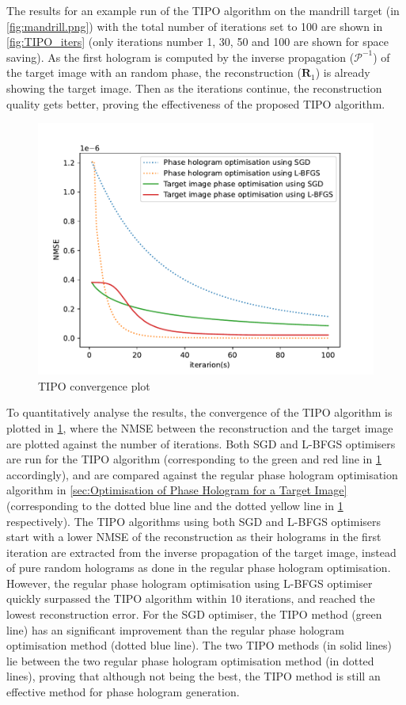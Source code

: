 The results for an example run of the TIPO algorithm on the mandrill target (in \cref{fig:mandrill.png}) with the total number of iterations set to 100 are shown in \cref{fig:TIPO_iters} (only iterations number 1, 30, 50 and 100 are shown for space saving). As the first hologram is computed by the inverse propagation ($\mathcal{P}^{-1}$) of the target image with an random phase, the reconstruction ($\textbf{R}_1$) is already showing the target image. Then as the iterations continue, the reconstruction quality gets better, proving the effectiveness of the proposed TIPO algorithm.

\begin{figure}[H]
	\centering
	\includegraphics[width=\textwidth]{TIPO_convergence.pdf}
	\caption{TIPO convergence plot}
	\label{fig:TIPO_convergence}
\end{figure}

To quantitatively analyse the results, the convergence of the TIPO algorithm is plotted in \cref{fig:TIPO_convergence}, where the NMSE between the reconstruction and the target image are plotted against the number of iterations. Both SGD and L-BFGS optimisers are run for the TIPO algorithm (corresponding to the green and red line in \cref{fig:TIPO_convergence} accordingly), and are compared against the regular phase hologram optimisation algorithm in \cref{sec:Optimisation of Phase Hologram for a Target Image} (corresponding to the dotted blue line and the dotted yellow line in \cref{fig:TIPO_convergence} respectively). The TIPO algorithms using both SGD and L-BFGS optimisers start with a lower NMSE of the reconstruction as their holograms in the first iteration are extracted from the inverse propagation of the target image, instead of pure random holograms as done in the regular phase hologram optimisation. However, the regular phase hologram optimisation using L-BFGS optimiser quickly surpassed the TIPO algorithm within 10 iterations, and reached the lowest reconstruction error. For the SGD optimiser, the TIPO method (green line) has an significant improvement than the regular phase hologram optimisation method (dotted blue line). The two TIPO methods (in solid lines) lie between the two regular phase hologram optimisation method (in dotted lines), proving that although not being the best, the TIPO method is still an effective method for phase hologram generation.


